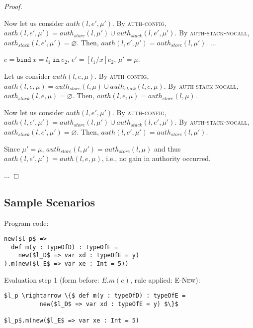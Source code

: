 \documentclass{llncs}
\newcommand{\keywadj}[1]{\mathtt{#1}}
\newcommand{\keyw}[1]{\keywadj{#1}~}
\newcommand{\pcase}[1][]{
  \if\relax\detokenize{#1}\relax
    \def\thiscase{}
  \else
    \def\thiscase{~#1}
  \fi
  \item
}
\begin{document}
\begin{proof}
\begin{pcases}
\hspace{12pt} Now let us consider $auth(l, e', \mu')$. By \textsc{auth-config}, $auth(l, e', \mu') = auth_{store}(l, \mu') \cup auth_{stack}(l, e',\mu')$. By \textsc{auth-stack-nocall}, $auth_{stack}(l, e', \mu') = \varnothing$. Then, $auth(l, e', \mu') = auth_{store}(l, \mu')$.
...
\\
\pcase[\textsc{E-Bind}]
$e = \keyw{bind} x = l_1~\keyw{in} e_2$, $e' = [l_1/x]e_2$, $\mu' = \mu$.

\hspace{12pt} Let us consider $auth(l, e, \mu)$. By \textsc{auth-config}, $auth(l, e, \mu) = auth_{store}(l, \mu) \cup auth_{stack}(l,e,\mu)$. By \textsc{auth-stack-nocall}, $auth_{stack}(l, e, \mu) = \varnothing$. Then, $auth(l, e, \mu) = auth_{store}(l, \mu)$.

\hspace{12pt} Now let us consider $auth(l, e', \mu')$. By \textsc{auth-config}, $auth(l, e', \mu') = auth_{store}(l, \mu') \cup auth_{stack}(l, e',\mu')$. By \textsc{auth-stack-nocall}, $auth_{stack}(l, e', \mu') = \varnothing$. Then, $auth(l, e', \mu') = auth_{store}(l, \mu')$.

\hspace{12pt} Since $\mu' = \mu$, $auth_{store}(l, \mu') = auth_{store}(l, \mu)$ and thus $auth(l, e', \mu') = auth(l, e, \mu)$, i.e., no gain in authority occurred.
\\
\end{pcases}

\noindent...
\end{proof}


\newpage

\subsection{Sample Scenarios}

\noindent\underline{}

\vspace{16pt}

\noindent Program code:
\vspace{-6pt}
\begin{lstlisting}[xleftmargin=20pt]
new($l_p$ =>
  def m(y : typeOfD) : typeOfE =
    new($l_D$ => var xd : typeOfE = y)
).m(new($l_E$ => var xe : Int = 5))
\end{lstlisting}

\vspace{12pt}
\noindent Evaluation step 1 (form before: $E.m(e)$, rule applied: \textsc{E-New}):
\vspace{-6pt}
\begin{lstlisting}[xleftmargin=20pt]
$l_p \rightarrow \{$ def m(y : typeOfD) : typeOfE =
          new($l_D$ => var xd : typeOfE = y) $\}$

$l_p$.m(new($l_E$ => var xe : Int = 5)
\end{lstlisting}
\end{document}
